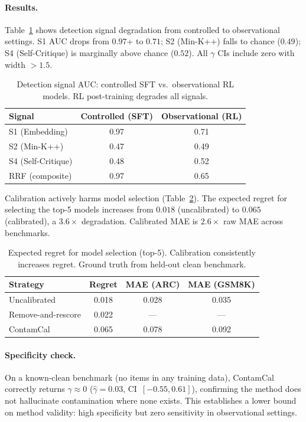 \documentclass[11pt,a4paper]{article}
\newcommand{\gam}{\gamma}
\begin{document}
\paragraph{Results.}
Table~\ref{tab:signal_degradation} shows detection signal degradation from controlled to observational settings.
S1 AUC drops from $0.97$+ to $0.71$; S2 (Min-K++) falls to chance ($0.49$); S4 (Self-Critique) is marginally above chance ($0.52$).
All $\gam$ CIs include zero with width $> 1.5$.

\begin{table}[t]
\centering
\small
\caption{Detection signal AUC: controlled SFT vs.\ observational RL models. RL post-training degrades all signals.}
\label{tab:signal_degradation}
\begin{tabular}{lcc}
\toprule
\textbf{Signal} & Controlled (SFT) & Observational (RL) \\
\midrule
S1 (Embedding)    & 0.97 & 0.71 \\
S2 (Min-K++)      & 0.47 & 0.49 \\
S4 (Self-Critique)& 0.48 & 0.52 \\
RRF (composite)   & 0.97 & 0.65 \\
\bottomrule
\end{tabular}
\end{table}

Calibration actively harms model selection (Table~\ref{tab:regret}).
The expected regret for selecting the top-5 models increases from $0.018$ (uncalibrated) to $0.065$ (calibrated), a $3.6\times$ degradation.
Calibrated MAE is $2.6\times$ raw MAE across benchmarks.

\begin{table}[t]
\centering
\small
\caption{Expected regret for model selection (top-5). Calibration consistently increases regret. Ground truth from held-out clean benchmark.}
\label{tab:regret}
\begin{tabular}{lccc}
\toprule
\textbf{Strategy} & Regret & MAE (ARC) & MAE (GSM8K) \\
\midrule
Uncalibrated       & 0.018 & 0.028 & 0.035 \\
Remove-and-rescore & 0.022 & ---   & --- \\
ContamCal          & 0.065 & 0.078 & 0.092 \\
\bottomrule
\end{tabular}
\end{table}

\paragraph{Specificity check.}
On a known-clean benchmark (no items in any training data), ContamCal correctly returns $\gam \approx 0$ ($\hat{\gam} = 0.03$, CI~$[-0.55, 0.61]$), confirming the method does not hallucinate contamination where none exists.
This establishes a lower bound on method validity: high specificity but zero sensitivity in observational settings.
\end{document}
